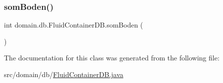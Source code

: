 \mbox{\label{classdomain_1_1db_1_1FluidContainerDB_a624c6278044ff6f8019b5ab088403499}} 
\subsubsection{\texorpdfstring{som\+Boden()}{somBoden()}}
{\footnotesize\ttfamily int domain.\+db.\+Fluid\+Container\+D\+B.\+som\+Boden (\begin{DoxyParamCaption}{ }\end{DoxyParamCaption})\hspace{0.3cm}{\ttfamily [inline]}}



The documentation for this class was generated from the following file\+:\begin{DoxyCompactItemize}
\item 
src/domain/db/\mbox{\hyperlink{FluidContainerDB_8java}{Fluid\+Container\+D\+B.\+java}}\end{DoxyCompactItemize}
